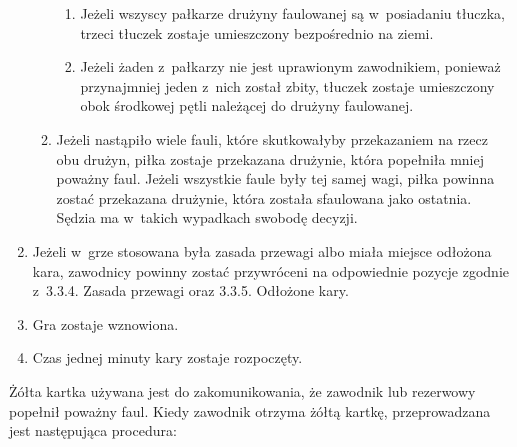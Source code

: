 \documentclass[12pt,a4paper]{article}
\renewcommand{\paragraph}[1]{
  \oldparagraph{#1}%
  \leftskip2.8cm
}
\begin{document}
\begin{enumerate}
\begin{enumerate}
		            \begin{enumerate}
			            \item
			                  Jeżeli wszyscy pałkarze drużyny faulowanej są w~posiadaniu
			                  tłuczka, trzeci tłuczek zostaje umieszczony bezpośrednio na ziemi.
			            \item
			                  Jeżeli żaden z~pałkarzy nie jest uprawionym zawodnikiem, ponieważ
			                  przynajmniej jeden z~nich został zbity, tłuczek zostaje
			                  umieszczony obok środkowej pętli należącej do drużyny faulowanej.
		            \end{enumerate}
		      \item
		            Jeżeli nastąpiło wiele fauli, które skutkowałyby przekazaniem na
		            rzecz obu drużyn, piłka zostaje przekazana drużynie, która popełniła
		            mniej poważny faul. Jeżeli wszystkie faule były tej samej wagi,
		            piłka powinna zostać przekazana drużynie, która została sfaulowana
		            jako ostatnia. Sędzia ma w~takich wypadkach swobodę decyzji.
	      \end{enumerate}
	\item
	      Jeżeli w~grze stosowana była zasada przewagi albo miała miejsce
	      odłożona kara, zawodnicy powinny zostać przywróceni na odpowiednie
	      pozycje zgodnie z~3.3.4. Zasada przewagi oraz 3.3.5. Odłożone kary.
	\item
	      Gra zostaje wznowiona.
	\item
	      Czas jednej minuty kary zostaje rozpoczęty.
\end{enumerate}

\paragraph{Żółta kartka}
Żółta kartka używana jest do
zakomunikowania, że zawodnik lub rezerwowy popełnił poważny faul. Kiedy
zawodnik otrzyma żółtą kartkę, przeprowadzana jest następująca
procedura:
\end{document}
